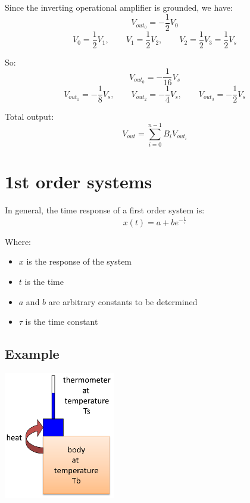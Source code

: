 \documentclass[11pt]{article}
\begin{document}
Since the inverting operational amplifier is grounded, we have:
\[V_{out_0} = - \frac{1}{2} V_0\]
\[V_0 = \frac{1}{2} V_1, \qquad V_1 = \frac{1}{2} V_2, \qquad V_2 = \frac{1}{2} V_3 = \frac{1}{2} V_s\]

So:
\[V_{out_0} = - \frac{1}{16} V_s\]
\[V_{out_1} = - \frac{1}{8} V_s, \qquad V_{out_2} = - \frac{1}{4} V_s, \qquad V_{out_3} = - \frac{1}{2} V_s \]

Total output:
\[V_{out} = \sum_{i = 0}^{n - 1} B_i V_{out_i}\]

 \newpage
\section{1st order systems}
\label{sec:orgb1e997e}
In general, the time response of a first order system is:
\[x(t) = a + b e^{-\frac{t}{\tau}}\]

Where:
\begin{itemize}
\item \(x\) is the response of the system
\item \(t\) is the time
\item \(a\) and \(b\) are arbitrary constants to be determined
\item \(\tau\) is the time constant
\end{itemize}

 \newpage
\subsection{Example}
\label{sec:org618d2c5}
\begin{center}
\includegraphics[height=15em]{./images/first-order-system-example-diagram.png}
\end{center}
\end{document}
